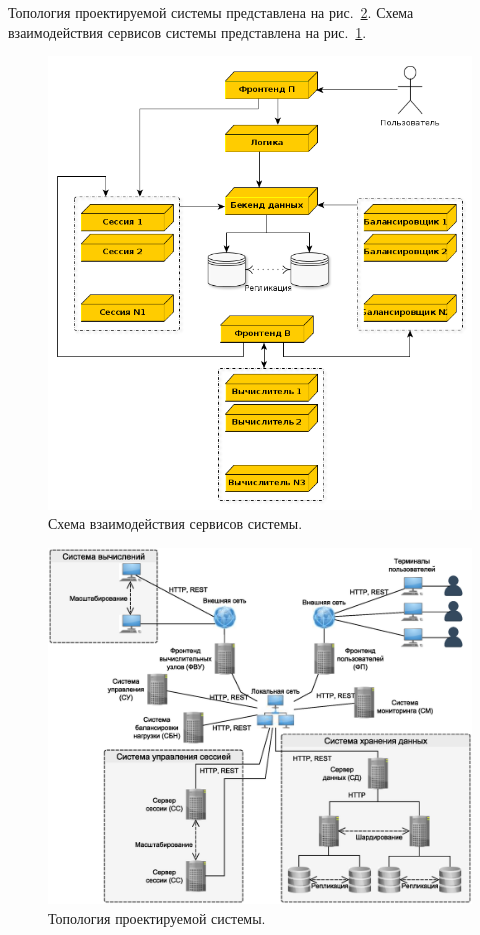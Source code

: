 \documentclass[a4paper,12pt]{report}
\numberwithin{equation}{section}
\begin{document}
Топология проектируемой системы представлена на рис.~\ref{fig:topology}.
Схема взаимодействия сервисов системы представлена на рис.~\ref{fig:interaction}.

\begin{figure}
    \centering
    \includegraphics[width=.8\linewidth]{img/interaction}
    \caption{Схема взаимодействия сервисов системы.}
    \label{fig:interaction}
\end{figure}

\begin{figure}
    \includegraphics[width=\linewidth]{img/topology}
    \caption{Топология проектируемой системы.}
    \label{fig:topology}
\end{figure}
\end{document}
